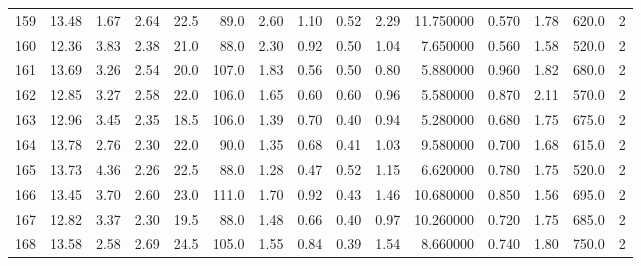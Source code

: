 \documentclass{article}
\begin{document}
\begin{tabular}{lrrrrrrrrrrrrrr}
    159 &    13.48 &        1.67 &  2.64 &               22.5 &       89.0 &           2.60 &        1.10 &                  0.52 &             2.29 &        11.750000 &  0.570 &                          1.78 &    620.0 &      2 \\
    160 &    12.36 &        3.83 &  2.38 &               21.0 &       88.0 &           2.30 &        0.92 &                  0.50 &             1.04 &         7.650000 &  0.560 &                          1.58 &    520.0 &      2 \\
    161 &    13.69 &        3.26 &  2.54 &               20.0 &      107.0 &           1.83 &        0.56 &                  0.50 &             0.80 &         5.880000 &  0.960 &                          1.82 &    680.0 &      2 \\
    162 &    12.85 &        3.27 &  2.58 &               22.0 &      106.0 &           1.65 &        0.60 &                  0.60 &             0.96 &         5.580000 &  0.870 &                          2.11 &    570.0 &      2 \\
    163 &    12.96 &        3.45 &  2.35 &               18.5 &      106.0 &           1.39 &        0.70 &                  0.40 &             0.94 &         5.280000 &  0.680 &                          1.75 &    675.0 &      2 \\
    164 &    13.78 &        2.76 &  2.30 &               22.0 &       90.0 &           1.35 &        0.68 &                  0.41 &             1.03 &         9.580000 &  0.700 &                          1.68 &    615.0 &      2 \\
    165 &    13.73 &        4.36 &  2.26 &               22.5 &       88.0 &           1.28 &        0.47 &                  0.52 &             1.15 &         6.620000 &  0.780 &                          1.75 &    520.0 &      2 \\
    166 &    13.45 &        3.70 &  2.60 &               23.0 &      111.0 &           1.70 &        0.92 &                  0.43 &             1.46 &        10.680000 &  0.850 &                          1.56 &    695.0 &      2 \\
    167 &    12.82 &        3.37 &  2.30 &               19.5 &       88.0 &           1.48 &        0.66 &                  0.40 &             0.97 &        10.260000 &  0.720 &                          1.75 &    685.0 &      2 \\
    168 &    13.58 &        2.58 &  2.69 &               24.5 &      105.0 &           1.55 &        0.84 &                  0.39 &             1.54 &         8.660000 &  0.740 &                          1.80 &    750.0 &      2 \\

\end{tabular}
\end{document}
